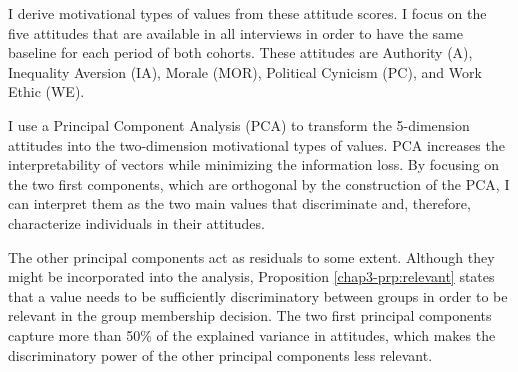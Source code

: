 I derive motivational types of values from these attitude scores. I focus on the five attitudes that are available in all interviews in order to have the same baseline for each period of both cohorts. These attitudes are Authority (A), Inequality Aversion (IA), Morale (MOR), Political Cynicism (PC), and Work Ethic (WE).

%
I use a Principal Component Analysis (PCA) to transform the 5-dimension attitudes into the two-dimension motivational types of values. PCA increases the interpretability of vectors while minimizing the information loss. By focusing on the two first components, which are orthogonal by the construction of the PCA, I can interpret them as the two main values that discriminate and, therefore, characterize individuals in their attitudes. 

The other principal components act as residuals to some extent. Although they might be incorporated into the analysis, Proposition \ref{chap3-prp:relevant} states that a value needs to be sufficiently discriminatory between groups in order to be relevant in the group membership decision. The two first principal components capture more than 50\% of the explained variance in attitudes, which makes the discriminatory power of the other principal components less relevant.

